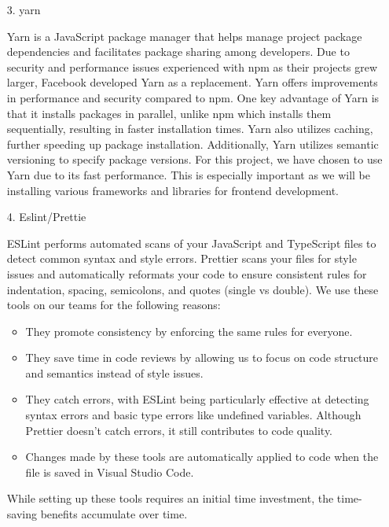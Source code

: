 \documentclass[conference, a4paper]{IEEEtran}
\begin{document}
\begin{enumerate}
\begin{enumerate}
        \item[3.]yarn \cite{yarn2016}
        \item[]Yarn is a JavaScript package manager that helps manage project package dependencies and facilitates package sharing among developers. Due to security and performance issues experienced with npm as their projects grew larger, Facebook developed Yarn as a replacement. Yarn offers improvements in performance and security compared to npm. One key advantage of Yarn is that it installs packages in parallel, unlike npm which installs them sequentially, resulting in faster installation times. Yarn also utilizes caching, further speeding up package installation. Additionally, Yarn utilizes semantic versioning to specify package versions. For this project, we have chosen to use Yarn due to its fast performance. This is especially important as we will be installing various frameworks and libraries for frontend development. \\

        \item[4.]Eslint/Prettie \cite{eslintprettier}
        \item[]ESLint performs automated scans of your JavaScript and TypeScript files to detect common syntax and style errors. Prettier scans your files for style issues and automatically reformats your code to ensure consistent rules for indentation, spacing, semicolons, and quotes (single vs double). We use these tools on our teams for the following reasons: \\
        \begin{itemize}
            \item They promote consistency by enforcing the same rules for everyone.\\
            \item They save time in code reviews by allowing us to focus on code structure and semantics instead of style issues.\\
            \item They catch errors, with ESLint being particularly effective at detecting syntax errors and basic type errors like undefined variables. Although Prettier doesn't catch errors, it still contributes to code quality.\\
            \item Changes made by these tools are automatically applied to code when the file is saved in Visual Studio Code.\\
        \end{itemize}
        While setting up these tools requires an initial time investment, the time-saving benefits accumulate over time.\\


\end{enumerate}
\end{enumerate}
\end{document}
